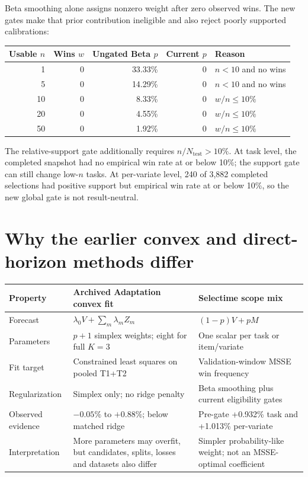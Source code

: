 \documentclass[10pt,a4paper]{article}
\begin{document}
Beta smoothing alone assigns nonzero weight after zero observed wins. The new
gates make that prior contribution ineligible and also reject poorly supported
calibrations:

\begin{center}
\small
\begin{tabular}{rrrrl}
\toprule
Usable $n$ & Wins $w$ & Ungated Beta $p$ & Current $p$ & Reason\\
\midrule
1 & 0 & 33.33\% & 0 & $n<10$ and no wins\\
5 & 0 & 14.29\% & 0 & $n<10$ and no wins\\
10 & 0 & 8.33\% & 0 & $w/n\le10\%$\\
20 & 0 & 4.55\% & 0 & $w/n\le10\%$\\
50 & 0 & 1.92\% & 0 & $w/n\le10\%$\\
\bottomrule
\end{tabular}
\end{center}

The relative-support gate additionally requires $n/N_{\mathrm{test}}>10\%$.
At task level, the completed snapshot had no empirical win rate at or below
10\%; the support gate can still change low-$n$ tasks. At per-variate level,
240 of 3,882 completed selections had positive support but empirical win rate
at or below 10\%, so the new global gate is not result-neutral.

\section{Why the earlier convex and direct-horizon methods differ}

\begin{center}
\small
\begin{tabularx}{\textwidth}{@{}p{25mm}XX@{}}
\toprule
Property & Archived Adaptation convex fit & Selectime scope mix\\
\midrule
Forecast & $\lambda_0V+\sum_m\lambda_mZ_m$ & $(1-p)V+pM$\\
Parameters & $p+1$ simplex weights; eight for full $K=3$ & One scalar per task or item/variate\\
Fit target & Constrained least squares on pooled T1+T2 & Validation-window MSSE win frequency\\
Regularization & Simplex only; no ridge penalty & Beta smoothing plus current eligibility gates\\
Observed evidence & $-0.05\%$ to $+0.88\%$; below matched ridge & Pre-gate +0.932\% task and +1.013\% per-variate\\
Interpretation & More parameters may overfit, but candidates, splits, losses and datasets also differ & Simpler probability-like weight; not an MSSE-optimal coefficient\\
\bottomrule
\end{tabularx}
\end{center}
\end{document}
